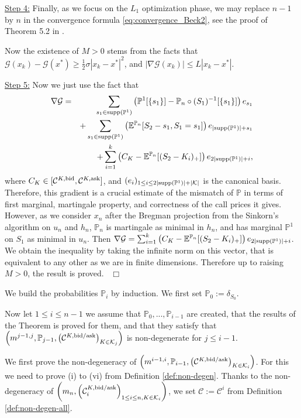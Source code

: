 \documentclass{amsart}%
\def \E{\mathbb{E}}
\def \P{{\mathbb P}}
\def\Cc{{\cal C}}
\def\Gc{{\cal G}}
\def\Kc{{\cal K}}
\def\no{\noindent}
\def \ep{\hbox{ }\hfill{ ${\cal t}$~\hspace{-5.1mm}~${\cal u}$   } }
\def \ep{\hbox{ }\hfill$\Box$}
\theoremstyle{definition}
\theoremstyle{remark}
\newcommand{\beaa}{\begin{eqnarray*}}
\newcommand{\eeaa}{\end{eqnarray*}}
\newcommand{\cal}{\mathcal}
\begin{document}
\no\underline{\rm Step 4:} Finally, as we focus on the $L_1$ optimization phase, we may replace $n-1$ by $n$ in the convergence formula \eqref{eq:convergence_Beck2}, see the proof of Theorem 5.2 in \cite{beck2013convergence}.

\no Now the existence of $M>0$ stems from the facts that $\Gc(x_k)-\Gc(x^*)\ge \frac12\sigma|x_k-x^*|^2$, and $|\nabla\Gc(x_k)|\le L|x_k-x^*|$.

\no\underline{\rm Step 5:} Now we just use the fact that
\beaa 
\nabla \Gc &=& \sum_{s_1\in{\rm supp}(\P^1)}\left(\P^1[\{s_1\}]-\P_n\circ (S_1)^{-1}[\{s_1\}]\right)e_{s_1}\\
&&+\sum_{s_1\in{\rm supp}(\P^1)}\left(\E^{\P_n}[S_2-s_1,S_1=s_1]\right)e_{|{\rm supp}(\P^1)|+s_1}\\
&&+\sum_{i=1}^k\left(C_K-\E^{\P_n}[(S_2-K_i)_+]\right)e_{2|{\rm supp}(\P^1)|+i},
\eeaa 
where $C_K\in[\Cc^{K,{\rm bid}},\Cc^{K,{\rm ask}}]$, and $(e_i)_{1\le i \le 2|{\rm supp}(\P^1)|+|\Kc|}$ is the canonical basis. Therefore, this gradient is a crucial estimate of the mismatch of $\P$ in terms of first marginal, martingale property, and correctness of the call prices it gives. However, as we consider $x_n$ after the Bregman projection from the Sinkorn's algorithm on $u_n$ and $h_n$, $\P_n$ is martingale as minimal in $h_n$, and has marginal $\P^1$ on $S_1$ as minimal in $u_n$. Then $\nabla \Gc =\sum_{i=1}^k\left(C_K-\E^{\P_n}[(S_2-K_i)_+]\right)e_{2|{\rm supp}(\P^1)|+i}$. We obtain the inequality by taking the infinite norm on this vector, that is equivalent to any other as we are in finite dimensions. Therefore up to raising $M>0$, the result is proved.
\ep


\no{\bf Proof of Theorem \ref{thm:minimG_elem_M_all}}
We build the probabilities $\P_i$ by induction. We first set $\P_0:= \delta_{S_0}$.

\no Now let $1\le i\le n-1$ we assume that $\P_0,...,\P_{i-1}$ are created, that the results of the Theorem is proved for them, and that they satisfy that $\left(m^{j-1,j}, \P_{j-1}, \left(\Cc^{K,{\rm bid/ask}}\right)_{K\in\Kc_{j}}\right)$ is non-degenerate for $j\le i-1$.

\no We first prove the non-degeneracy of $\left(m^{i-1,i}, \P_{i-1}, \left(\Cc^{K,{\rm bid/ask}}\right)_{K\in\Kc_{i}}\right)$. For this we need to prove \rm{(i)} to \rm{(vi)} from Definition \ref{def:non-degen}. Thanks to the non-degeneracy of $\left(m_n, \left(\Cc^{K,{\rm bid/ask}}_i\right)_{1\le i\le n,K\in\Kc_i}\right)$, we set $\Cc:=\Cc^{i}$ from Definition \ref{def:non-degen-all}.
\end{document}
